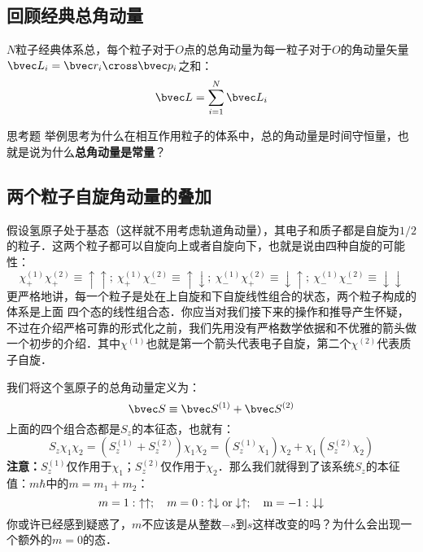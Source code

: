 \subsection{回顾经典总角动量}
$N$粒子经典体系总，每个粒子对于$O$点的总角动量为每一粒子对于$O$的角动量矢量$\bvec L_i=\bvec r_i\cross\bvec p_i$之和：
\begin{equation}
\bvec L = \sum_{i=1}^N \bvec L_i
\end{equation}
\begin{exercise}{思考题}
举例思考为什么在相互作用粒子的体系中，总的角动量是时间守恒量，也就是说为什么\textbf{总角动量是常量}？
\end{exercise}
\subsection{两个粒子自旋角动量的叠加}
假设氢原子处于基态（这样就不用考虑轨道角动量），其电子和质子都是自旋为$1/2$的粒子．这两个粒子都可以自旋向上或者自旋向下，也就是说由四种自旋的可能性：
\begin{equation}
\chi^{(1)}_+\chi^{(2)}_+\equiv\uparrow\uparrow;\ \chi^{(1)}_+\chi^{(2)}_-\equiv\uparrow\downarrow;\ \chi^{(1)}_-\chi^{(2)}_+\equiv\downarrow\uparrow;\ \chi^{(1)}_-\chi^{(2)}_-\equiv\downarrow\downarrow
\end{equation}
更严格地讲，每一个粒子是处在上自旋和下自旋线性组合的状态，两个粒子构成的体系是上面
四个态的线性组合态．你应当对我们接下来的操作和推导产生怀疑，不过在介绍严格可靠的形式化之前，我们先用没有严格数学依据和不优雅的箭头做一个初步的介绍．其中$\chi^{(1)}$也就是第一个箭头代表电子自旋，第二个$\chi^{(2)}$代表质子自旋．

我们将这个氢原子的总角动量定义为：
\begin{equation}
\bvec S \equiv \bvec S^{(1)}+\bvec S^{(2)}
\end{equation}
上面的四个组合态都是$S_z$的本征态，也就有：
\begin{equation}
S_z\chi_1\chi_2=(S_z^{(1)}+S_z^{(2)})\chi_1\chi_2=(S_z^{(1)}\chi_1)\chi_2+\chi_1(S_z^{(2)}\chi_2)
\end{equation}
\textbf{注意：}$S_z^{(1)}$仅作用于$\chi_1$；$S_z^{(2)}$仅作用于$\chi_2$．那么我们就得到了该系统$S_z$的本征值：$m\hbar$中的$m=m_1+m_2$：
\begin{equation}
m=1: \ \uparrow\uparrow;\quad m=0: \ \uparrow\downarrow \rm{or} \downarrow\uparrow;\quad m=-1:\ \downarrow\downarrow
\end{equation}
你或许已经感到疑惑了，$m$不应该是从整数$-s$到$s$这样改变的吗？为什么会出现一个额外的$m=0$的态．

